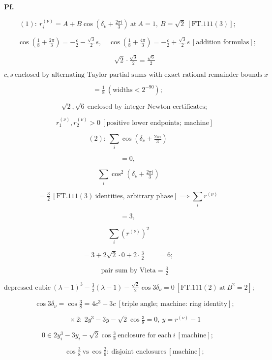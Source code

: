 \textbf{Pf.}

\[
(1):\ r_i^{(\nu)}=A+B\cos(\delta_\nu+\tfrac{2\pi i}3)\ \text{at}\ A=1,\ B=\sqrt2\ [\mathrm{FT.111}(3)];
\]

\[
\qquad \cos(\tfrac18+\tfrac{2\pi}3)=-\tfrac c2-\tfrac{\sqrt3}2s,\quad\cos(\tfrac18+\tfrac{4\pi}3)=-\tfrac c2+\tfrac{\sqrt3}2s\ [\text{addition formulas}];
\]

\[
\qquad \sqrt2\cdot\tfrac{\sqrt3}2=\tfrac{\sqrt6}2
\]

\[
c, s\ \text{enclosed by alternating Taylor partial sums with exact rational remainder bounds at}\ x
\]

\[
= \tfrac18\ (\text{widths}<2^{-90});
\]

\[
\qquad \sqrt2,\sqrt6\ \text{enclosed by integer Newton certificates};
\]

\[
\qquad r_1^{(\nu)},r_2^{(\nu)}>0\ [\text{positive lower endpoints};\ \text{machine}]
\]

\[
(2):\ \textstyle\sum_i\cos(\delta_\nu+\tfrac{2\pi i}3)
\]

\[
= 0,
\]

\[
\ \sum_i\cos^2(\delta_\nu+\tfrac{2\pi i}3)
\]

\[
= \tfrac32\ [\mathrm{FT.111}(3)\ \text{identities, arbitrary phase}]\implies\sum_ir^{(\nu)}
\]

\[
= 3,
\]

\[
\ \sum_i(r^{(\nu)})^2
\]

\[
= 3+2\sqrt2\cdot0+2\cdot\tfrac32\qquad = 6;
\]

\[
\qquad \text{pair sum by Vieta}=\tfrac32
\]

\[
\text{depressed cubic}\ (\lambda-1)^3-\tfrac32(\lambda-1)-\tfrac{\sqrt2}2\cos3\delta_\nu=0\ [\mathrm{FT.111}(2)\ \text{at}\ B^2=2];
\]

\[
\qquad \cos3\delta_\nu=\cos\tfrac38=4c^3-3c\ [\text{triple angle};\ \text{machine: ring identity}];
\]

\[
\qquad \times2:\ 2y^3-3y-\sqrt2\cos\tfrac38=0,\ y=r^{(\nu)}-1
\]

\[
0\in2y_i^3-3y_i-\sqrt2\cos\tfrac38\ \text{enclosure for each}\ i\ [\text{machine}];
\]

\[
\qquad \cos\tfrac38\ \text{vs}\ \cos\tfrac29:\ \text{disjoint enclosures}\ [\text{machine}];
\]

